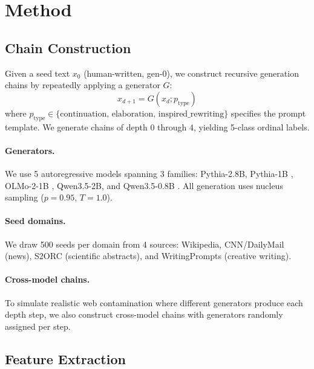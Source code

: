 \documentclass[letterpaper]{article}
\begin{document}
\section{Method}
\label{sec:method}

\subsection{Chain Construction}
\label{sec:chains}

Given a seed text $x_0$ (human-written, gen-0), we construct recursive generation chains by repeatedly applying a generator $G$:
\begin{equation}
    x_{d+1} = G(x_d; p_\text{type})
\end{equation}
where $p_\text{type} \in \{\text{continuation, elaboration, inspired\_rewriting}\}$ specifies the prompt template. We generate chains of depth 0 through 4, yielding 5-class ordinal labels.

\paragraph{Generators.} We use 5 autoregressive models spanning 3 families: Pythia-2.8B, Pythia-1B \citep{biderman2023pythia}, OLMo-2-1B \citep{groeneveld2024olmo}, Qwen3.5-2B, and Qwen3.5-0.8B \citep{bai2023qwen}. All generation uses nucleus sampling ($p = 0.95$, $T = 1.0$).

\paragraph{Seed domains.} We draw 500 seeds per domain from 4 sources: Wikipedia, CNN/DailyMail (news), S2ORC (scientific abstracts), and WritingPrompts (creative writing).

\paragraph{Cross-model chains.} To simulate realistic web contamination where different generators produce each depth step, we also construct cross-model chains with generators randomly assigned per step.

\subsection{Feature Extraction}
\label{sec:features}
\end{document}
